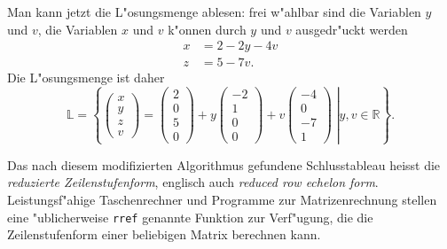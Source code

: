 \begin{beispiel}
Man kann jetzt die L"osungsmenge ablesen: frei w"ahlbar sind die Variablen 
$y$ und $v$, die Variablen $x$ und $v$ k"onnen durch $y$ und $v$ ausgedr"uckt
werden
\begin{align*}
x&=2-2y-4v\\
z&=5-7v.
\end{align*}
Die L"osungsmenge ist daher
\[
{\mathbb L}
=
\left\{
\left.
\begin{pmatrix}x\\y\\z\\v\end{pmatrix}
=
\begin{pmatrix}2\\0\\5\\0\end{pmatrix}
+y\begin{pmatrix}-2\\1\\0\\0\end{pmatrix}
+v\begin{pmatrix}-4\\0\\-7\\1\end{pmatrix}\;\right|
y,v\in\mathbb R
\right\}.
\]
\end{beispiel}

Das nach diesem modifizierten Algorithmus gefundene Schlusstableau heisst
die {\em reduzierte Zeilenstufenform}, englisch auch {\em reduced row echelon form}.
Leistungsf"ahige Taschenrechner und Programme zur Matrizenrechnung stellen
eine "ublicherweise \texttt{rref} genannte Funktion zur Verf"ugung, die die 
Zeilenstufenform einer beliebigen Matrix berechnen kann.

